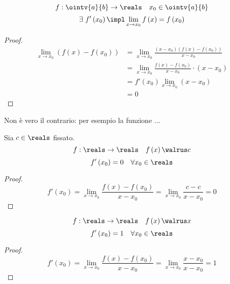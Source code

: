 \begin{theorem}
  $$f:\ointv{a}{b}\to\reals\quad x_0\in\ointv{a}{b}$$
  $$\exists\ f'\left(x_0\right)\impl \lim_{x\to x_0}f\left(x\right)=f\left(x_0\right)$$
\end{theorem}
\begin{proof}
  \begin{align*}
    \lim_{x\to x_0}\left(f\left(x\right)-f\left(x_0\right)\right) & =\lim_{x\to x_0}\frac{\left(x-x_0\right)\left(f\left(x\right)-f\left(x_0\right)\right)}{x-x_0} \\
                                                                  & =\lim_{x\to x_0}\frac{f\left(x\right)-f\left(x_0\right)}{x-x_0}\cdot\left(x-x_0\right)         \\
                                                                  & =f'\left(x_0\right)\lim_{x\to x_0}\left(x-x_0\right)                                           \\
                                                                  & =0                                                                                             
  \end{align*}
\end{proof}

\begin{observation}
  Non è vero il contrario: per esempio la funzione ... %
\end{observation}

\begin{lemma}
  Sia $c\in\reals$ fissato.
  $$f:\reals\to\reals\quad f\left(x\right)\walrus c$$
  $$f'\left(x_0\right)=0\quad \forall x_0\in\reals$$
\end{lemma}
\begin{proof}
  $$f'\left(x_0\right)=\lim_{x\to x_0}\frac{f\left(x\right)-f\left(x_0\right)}{x-x_0}=\lim_{x\to x_0}\frac{c-c}{x-x_0}=0$$
\end{proof}

\begin{lemma}
  $$f:\reals\to\reals\quad f\left(x\right)\walrus x$$
  $$f'\left(x_0\right)=1\quad \forall x_0\in\reals$$
\end{lemma}
\begin{proof}
  $$f'\left(x_0\right)=\lim_{x\to x_0}\frac{f\left(x\right)-f\left(x_0\right)}{x-x_0}=\lim_{x\to x_0}\frac{x-x_0}{x-x_0}=1$$
\end{proof}


